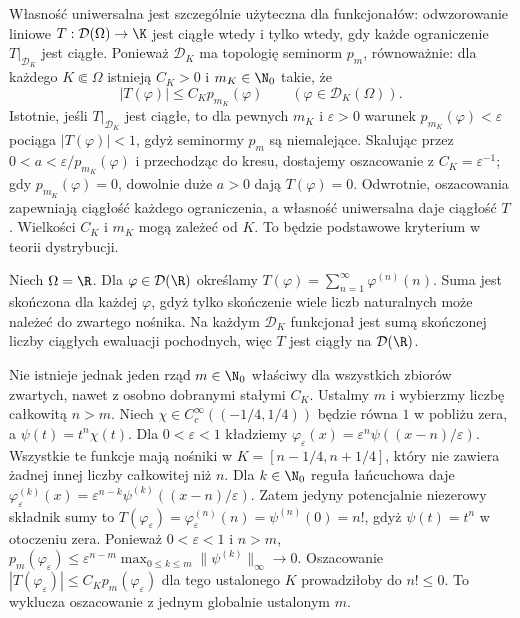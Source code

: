 \begin{uwaga}
\label{rem:D-dual18}
Własność uniwersalna jest szczególnie użyteczna dla
funkcjonałów: odwzorowanie liniowe $T:\mathcal D(\Omega)\to\K$
jest ciągłe wtedy i tylko wtedy, gdy każde ograniczenie
$T|_{\mathcal D_K}$ jest ciągłe. Ponieważ $\mathcal D_K$
ma topologię seminorm $p_m$, równoważnie: dla każdego
$K\Subset\Omega$ istnieją $C_K>0$ i $m_K\in\N_0$ takie, że
\[
 |T(\varphi)|\le C_K p_{m_K}(\varphi)
 \qquad(\varphi\in\mathcal D_K(\Omega)).
\]
Istotnie, jeśli $T|_{\mathcal D_K}$ jest ciągłe, to dla pewnych
$m_K$ i $\varepsilon>0$ warunek $p_{m_K}(\varphi)<\varepsilon$
pociąga $|T(\varphi)|<1$, gdyż seminormy $p_m$ są niemalejące.
Skalując przez $0<a<\varepsilon/p_{m_K}(\varphi)$
i przechodząc do kresu, dostajemy oszacowanie z
$C_K=\varepsilon^{-1}$; gdy $p_{m_K}(\varphi)=0$,
dowolnie duże $a>0$ dają $T(\varphi)=0$.
Odwrotnie, oszacowania zapewniają ciągłość każdego ograniczenia,
a własność uniwersalna daje ciągłość $T$.
Wielkości $C_K$ i $m_K$ mogą zależeć od $K$.
To będzie podstawowe kryterium w teorii dystrybucji.
\end{uwaga}


\begin{przyklad}
\label{ex:variable-order18}
Niech $\Omega=\R$. Dla $\varphi\in\mathcal D(\R)$ określamy
$T(\varphi)=\sum_{n=1}^\infty \varphi^{(n)}(n)$.
Suma jest skończona dla każdej $\varphi$, gdyż tylko skończenie
wiele liczb naturalnych może należeć do zwartego nośnika.
Na każdym $\mathcal D_K$ funkcjonał jest sumą skończonej
liczby ciągłych ewaluacji pochodnych, więc $T$ jest ciągły
na $\mathcal D(\R)$.

Nie istnieje jednak jeden rząd $m\in\N_0$ właściwy dla wszystkich
zbiorów zwartych, nawet z osobno dobranymi stałymi $C_K$.
Ustalmy $m$ i wybierzmy liczbę całkowitą $n>m$.
Niech $\chi\in C_c^\infty((-1/4,1/4))$ będzie równa $1$
w pobliżu zera, a $\psi(t)=t^n\chi(t)$. Dla $0<\varepsilon<1$
kładziemy $\varphi_\varepsilon(x)=\varepsilon^n
\psi((x-n)/\varepsilon)$. Wszystkie te funkcje mają
nośniki w $K=[n-1/4,n+1/4]$, który nie zawiera żadnej
innej liczby całkowitej niż $n$. Dla $k\in\N_0$ reguła
łańcuchowa daje
$\varphi_\varepsilon^{(k)}(x)=
\varepsilon^{n-k}\psi^{(k)}((x-n)/\varepsilon)$.
Zatem jedyny potencjalnie niezerowy składnik sumy to
$T(\varphi_\varepsilon)=\varphi_\varepsilon^{(n)}(n)
=\psi^{(n)}(0)=n!$, gdyż $\psi(t)=t^n$ w otoczeniu zera.
Ponieważ $0<\varepsilon<1$ i $n>m$,
$p_m(\varphi_\varepsilon)\le
\varepsilon^{n-m}\max_{0\le k\le m}\|\psi^{(k)}\|_\infty\to0$.
Oszacowanie $|T(\varphi_\varepsilon)|\le C_Kp_m(\varphi_\varepsilon)$
dla tego ustalonego $K$ prowadziłoby do $n!\le0$.
To wyklucza oszacowanie z jednym globalnie ustalonym $m$.
\end{przyklad}

